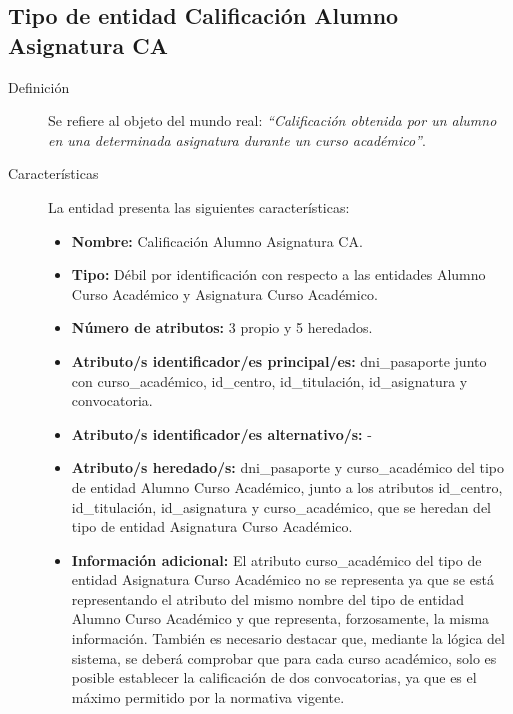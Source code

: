 \subsection{Tipo de entidad Calificación Alumno Asignatura CA}

   \begin{description}

   \item[Definición] Se refiere al objeto del mundo real: \emph{``Calificación
   obtenida por un alumno en una determinada asignatura durante un curso
   académico''}.

   \item[Características] La entidad presenta las siguientes características:
      \begin{itemize}
         \item \textbf{Nombre:} Calificación Alumno Asignatura CA.
         \item \textbf{Tipo:} Débil por identificación con respecto a las
         entidades Alumno Curso Académico y Asignatura Curso Académico.
         \item \textbf{Número de atributos:} 3 propio y 5 heredados.
         \item \textbf{Atributo/s identificador/es principal/es:} dni\_pasaporte
         junto con curso\_académico, id\_centro, id\_titulación, id\_asignatura
         y convocatoria.
         \item \textbf{Atributo/s identificador/es alternativo/s:} -
         \item \textbf{Atributo/s heredado/s:} dni\_pasaporte y curso\_académico
         del tipo de entidad Alumno Curso Académico, junto a los atributos id\_centro,
         id\_titulación, id\_asignatura y curso\_académico, que se heredan del
         tipo de entidad Asignatura Curso Académico.
         \item \textbf{Información adicional:} El atributo curso\_académico del
         tipo de entidad Asignatura Curso Académico no se representa ya que se
         está representando el atributo del mismo nombre del tipo de entidad
         Alumno Curso Académico y que representa, forzosamente, la misma
         información. También es necesario destacar que, mediante la lógica del
         sistema, se deberá comprobar que para cada curso académico, solo es
         posible establecer la calificación de dos convocatorias, ya que es el
         máximo permitido por la normativa vigente.
      \end{itemize}


\end{description}
